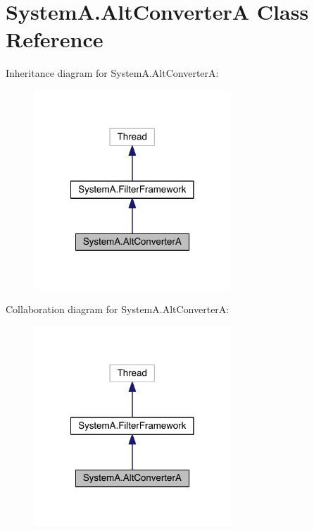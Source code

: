 \hypertarget{class_system_a_1_1_alt_converter_a}{}\section{System\+A.\+Alt\+Converter\+A Class Reference}
\label{class_system_a_1_1_alt_converter_a}


Inheritance diagram for System\+A.\+Alt\+Converter\+A\+:\nopagebreak
\begin{figure}[H]
\begin{center}
\leavevmode
\includegraphics[width=210pt]{class_system_a_1_1_alt_converter_a__inherit__graph}
\end{center}
\end{figure}


Collaboration diagram for System\+A.\+Alt\+Converter\+A\+:\nopagebreak
\begin{figure}[H]
\begin{center}
\leavevmode
\includegraphics[width=210pt]{class_system_a_1_1_alt_converter_a__coll__graph}
\end{center}
\end{figure}
